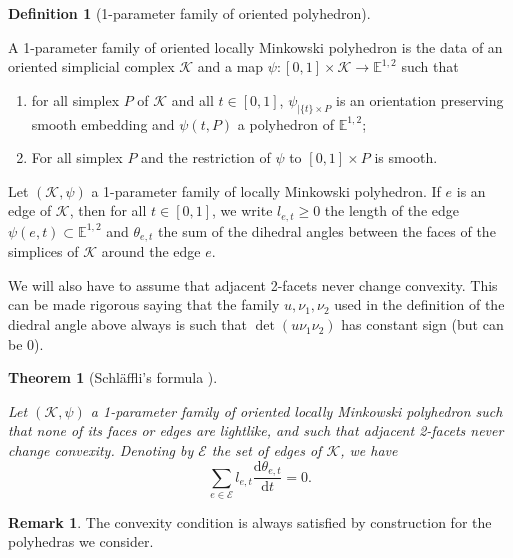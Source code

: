 \documentclass[a4paper,12pt]{article}
\def\d{\mathrm{d}}
\newcommand{\mass}[1]{{\mathbb E}^{1,2}_{#1}}
\def\d{\mathrm{d}}
\newtheorem*{theon}{Theorem}
\theoremstyle{definition}
\newtheorem{defi}[lem]{Definition}	%
\newtheorem*{rem}{Remark}			 %
\begin{document}
					\begin{defi}[1-parameter family of oriented polyhedron]\label{def:parameter_family_oriented_polyhedron}\

						A 1-parameter family of oriented locally Minkowski polyhedron is the data of an oriented simplicial complex $\mathcal K$ and a map $\psi:[0,1]\times \mathcal K \rightarrow \mass{}$ such that
						\begin{enumerate}
						 \item for all simplex $P$ of $\mathcal K$ and all $t\in [0,1]$, $\psi_{|\{t\}\times P}$ is an orientation preserving smooth embedding
						 and $\psi(t,P)$ a polyhedron of $\mass{}$;
						 \item For all simplex $P$ and the restriction of $\psi$ to $[0,1]\times P$ is smooth.
						\end{enumerate}
					\end{defi}

					

					Let $(\mathcal K,\psi)$ a 1-parameter family of locally Minkowski polyhedron.
					If $e$ is an edge of $\mathcal K$, then for all $t\in [0,1]$,
					 we write $l_{e,t}\geq0$ the length of the edge $\psi(e,t)\subset \mass{}$
					 and $\theta_{e,t}$ the sum of the dihedral angles between the faces of the simplices of $\mathcal K$ around the edge $e$.
					
					We will also have to assume that adjacent 2-facets never change convexity. This can be made rigorous saying that the family $u,\nu_1,\nu_2$ used in the definition of the diedral angle above always is such that $\det(u\nu_1\nu_2)$ has constant sign (but can be 0).
					
					
					\begin{theon}[Schläffli's formula \cite{MR2030165}]\label{theo:schl_ffli_formula_mr}\
					
					 Let $(\mathcal K,\psi)$ a 1-parameter family of oriented locally Minkowski polyhedron such that none of its faces or edges are lightlike, and such that adjacent 2-facets never change convexity. 
					 Denoting by $\mathcal E$ the set of edges of $\mathcal K$, we have
					 $$ \sum_{e\in \mathcal E} l_{e,t} \frac{\d \theta_{e,t}}{\d t}=0.$$
					\end{theon}
                    
                    \begin{rem}\label{rem:convexity_condition_always_satisfied}
                     The convexity condition is always satisfied by construction for the polyhedras we consider. 
                    \end{rem}
\end{document}
